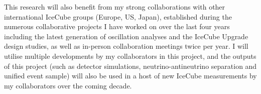 \documentclass[a4paper,11pt]{article}
\begin{document}
This research will also benefit from my strong collaborations with other international IceCube groups (Europe, US, Japan), established during the numerous collaborative projects I have worked on over the last four years including  the latest generation of oscillation analyses and the IceCube Upgrade design studies, as well as in-person collaboration meetings twice per year. I will utilise multiple developments by my collaborators in this project, and the outputs of this project (such as detector simulations, neutrino-antineutrino separation and unified event sample) will also be used in a host of new IceCube measurements by my collaborators over the coming decade.




\end{document}
